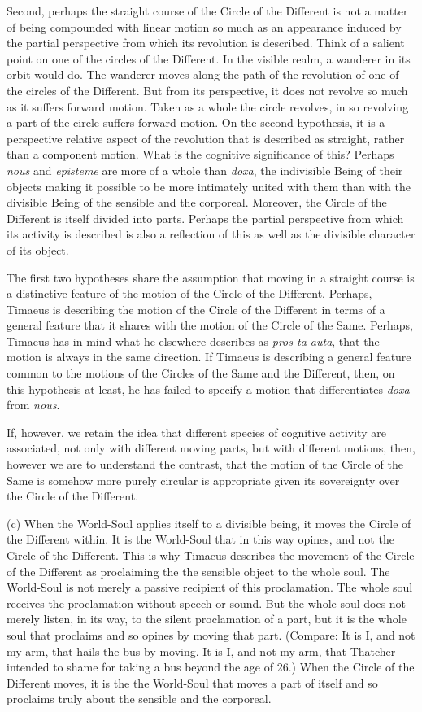 Second, perhaps the straight course of the Circle of the Different is not a matter of being compounded with linear motion so much as an appearance induced by the partial perspective from which its revolution is described. Think of a salient point on one of the circles of the Different. In the visible realm, a wanderer in its orbit would do. The wanderer moves along the path of the revolution of one of the circles of the Different. But from its perspective, it does not revolve so much as it suffers forward motion.  Taken as a whole the circle revolves, in so revolving a part of the circle suffers forward motion. On the second hypothesis, it is a perspective relative aspect of the revolution that is described as straight, rather than a component motion. What is the cognitive significance of this? Perhaps \emph{nous} and \emph{epistēme} are more of a whole than \emph{doxa}, the indivisible Being of their objects making it possible to be more intimately united with them than with the divisible Being of the sensible and the corporeal. Moreover, the Circle of the Different is itself divided into parts. Perhaps the partial perspective from which its activity is described is also a reflection of this as well as the divisible character of its object.

The first two hypotheses share the assumption that moving in a straight course is a distinctive feature of the motion of the Circle of the Different. Perhaps, Timaeus is describing the motion of the Circle of the Different in terms of a general feature that it shares with the motion of the Circle of the Same. Perhaps, Timaeus has in mind what he elsewhere describes as \emph{pros ta auta}, that the motion is always in the same direction. If Timaeus is describing a general feature common to the motions of the Circles of the Same and the Different, then, on this hypothesis at least, he has failed to specify a motion that differentiates \emph{doxa} from \emph{nous}.

If, however, we retain the idea that different species of cognitive activity are associated, not only with different moving parts, but with different motions, then, however we are to understand the contrast, that the motion of the Circle of the Same is somehow more purely circular is appropriate given its sovereignty over the Circle of the Different.

(c) When the World-Soul applies itself to a divisible being, it moves the Circle of the Different within. It is the World-Soul that in this way opines, and not the Circle of the Different. This is why Timaeus describes the movement of the Circle of the Different as proclaiming the the sensible object to the whole soul. The World-Soul is not merely a passive recipient of this proclamation. The whole soul receives the proclamation without speech or sound. But the whole soul does not merely listen, in its way, to the silent proclamation of a part, but it is the whole soul that proclaims and so opines by moving that part. (Compare: It is I, and not my arm, that hails the bus by moving. It is I, and not my arm, that Thatcher intended to shame for taking a bus beyond the age of 26.) When the Circle of the Different moves, it is the the World-Soul that moves a part of itself and so proclaims truly about the sensible and the corporeal. 

